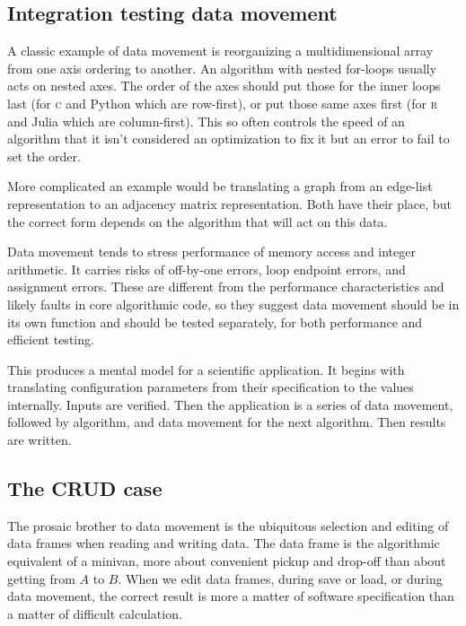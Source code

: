 \documentclass[fleqn,10pt]{olplainarticle}
\newcommand{\rlang}{\textsc{r}\xspace}
\begin{document}
\subsection{Integration testing data movement}

A classic example of data movement is reorganizing a multidimensional
array from one axis ordering to another. An algorithm with nested
for-loops usually acts on nested axes. The order of the axes should
put those for the inner loops last (for \textsc{c} and Python which are row-first), or put those
same axes first (for \rlang and Julia which are column-first). This so
often controls the speed of an algorithm that it isn't considered an 
optimization to fix it but an error to fail to set the order.

More complicated an example would be translating a graph from
an edge-list representation to an adjacency matrix representation.
Both have their place, but the correct form depends on the
algorithm that will act on this data.

Data movement tends to stress performance of memory access
and integer arithmetic. It carries risks of off-by-one errors,
loop endpoint errors, and assignment errors. These are different
from the performance characteristics and likely faults in core
algorithmic code, so they suggest data movement should be in its
own function and should be tested separately, for both performance
and efficient testing.

This produces a mental model for a scientific application. It begins
with translating configuration parameters from their specification
to the values internally. Inputs are verified. Then the application
is a series of data movement, followed by algorithm, and data movement
for the next algorithm. Then results are written.

\subsection{The CRUD case}\label{sec:crud}

The prosaic brother to data movement is the ubiquitous selection
and editing of data frames when reading and writing data.
The data frame is the algorithmic equivalent of a minivan, more
about convenient pickup and drop-off than about getting from $A$
to $B$. When we edit data frames, during save or load, or during
data movement, the correct result is more a matter of software specification
than a matter of difficult calculation.
\end{document}
